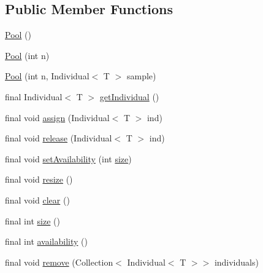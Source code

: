 \subsection*{Public Member Functions}
\begin{DoxyCompactItemize}
\item 
\hyperlink{classjenes_1_1population_1_1_pool_3_01_t_01extends_01_chromosome_01_4_a4bd84795aaada004e3abac72137269fa}{Pool} ()
\item 
\hyperlink{classjenes_1_1population_1_1_pool_3_01_t_01extends_01_chromosome_01_4_a1f1455e87c094df383563c96e88c4d1b}{Pool} (int n)
\item 
\hyperlink{classjenes_1_1population_1_1_pool_3_01_t_01extends_01_chromosome_01_4_a4326e7c61485eebd85e0ee33ade6ae4a}{Pool} (int n, Individual$<$ T $>$ sample)
\item 
final Individual$<$ T $>$ \hyperlink{classjenes_1_1population_1_1_pool_3_01_t_01extends_01_chromosome_01_4_a56aa9e4c1a8fb6c95c88cbc09f677400}{get\-Individual} ()
\item 
final void \hyperlink{classjenes_1_1population_1_1_pool_3_01_t_01extends_01_chromosome_01_4_aea055f4f71829a56c9d16780d010e861}{assign} (Individual$<$ T $>$ ind)
\item 
final void \hyperlink{classjenes_1_1population_1_1_pool_3_01_t_01extends_01_chromosome_01_4_a5fce371a24676e555aca961e61fb55ae}{release} (Individual$<$ T $>$ ind)
\item 
final void \hyperlink{classjenes_1_1population_1_1_pool_3_01_t_01extends_01_chromosome_01_4_a625297bb7b48e3b6ab11c081874580bf}{set\-Availability} (int \hyperlink{classjenes_1_1population_1_1_pool_3_01_t_01extends_01_chromosome_01_4_a71999d0d1f42f4448c7615cd43bea2f8}{size})
\item 
final void \hyperlink{classjenes_1_1population_1_1_pool_3_01_t_01extends_01_chromosome_01_4_ac9cfd19d4ef83db5f3b1e805458714c2}{resize} ()
\item 
final void \hyperlink{classjenes_1_1population_1_1_pool_3_01_t_01extends_01_chromosome_01_4_a05198e410de8e3d8d12f5598daf079bd}{clear} ()
\item 
final int \hyperlink{classjenes_1_1population_1_1_pool_3_01_t_01extends_01_chromosome_01_4_a71999d0d1f42f4448c7615cd43bea2f8}{size} ()
\item 
final int \hyperlink{classjenes_1_1population_1_1_pool_3_01_t_01extends_01_chromosome_01_4_a8e4a835cda9803129b44c952459ed7da}{availability} ()
\item 
final void \hyperlink{classjenes_1_1population_1_1_pool_3_01_t_01extends_01_chromosome_01_4_afcaf4da5e38def2dfcc15f7fb26103a0}{remove} (Collection$<$ Individual$<$ T $>$$>$ individuals)
$$
\end{DoxyCompactItemize}
